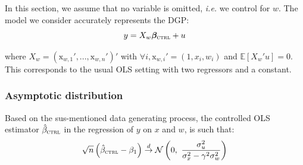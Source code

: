 \documentclass[a4paper, 11pt]{report}
\begin{document}
			In this section, we assume that no variable is omitted, \textit{i.e.} we control for $w$. The model we consider accurately represents the DGP: 
						~
                    				\begin{equation}\label{maths_eq_ovb}
                    					y = X_{w}\bm{\beta}_{\textsc{ctrl}} + u
                    				\end{equation}
                    				
                    				where $X_{w} = (\text{x}_{w, 1}', ..., \text{x}_{w, n}')'$ with $\forall i, \text{x}_{w, i}' = (1, x_{i}, w_{i})$ and $\mathbb{E}[X_{w}'u] = 0$. This corresponds to the usual OLS setting with two regressors and a constant.
		
			\subsubsection{Asymptotic distribution}
		
			\begin{lemma}\label{lemma_ctrl}
				Based on the sus-mentioned data generating process, the controlled OLS estimator $\hat{\beta}_{\textsc{ctrl}}$ in the regression of $y$ on $x$ and $w$, is such that:
				\[
						\sqrt{n}\left( \hat{\beta}_{\textsc{ctrl}} - \beta_{1} \right)
						 \overset{d}{\to} \mathcal{N}\left( 0 , \ \dfrac{ \sigma_{u}^{2}}{\sigma_{x}^{2} - \gamma^{2}\sigma_{w}^{2}} \right) 
				\]
			\end{lemma}
			
\end{document}
